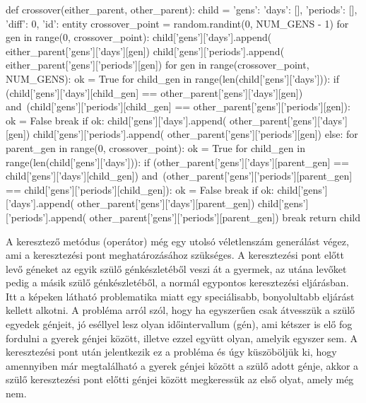 \begin{python}
def crossover(either_parent, other_parent):
    child = {'gens': {'days': [], 'periods': []},
             'diff': 0, 'id': entity}
    crossover_point = random.randint(0, NUM_GENS - 1)
    for gen in range(0, crossover_point):
        child['gens']['days'].append(
            either_parent['gens']['days'][gen])
        child['gens']['periods'].append(
            either_parent['gens']['periods'][gen])
    for gen in range(crossover_point, NUM_GENS):
        ok = True
        for child_gen in range(len(child['gens']['days'])):
            if (child['gens']['days'][child_gen] ==
               other_parent['gens']['days'][gen]) and\
               (child['gens']['periods'][child_gen] ==
               other_parent['gens']['periods'][gen]):
                ok = False
                break
        if ok:
            child['gens']['days'].append(
                other_parent['gens']['days'][gen])
            child['gens']['periods'].append(
                other_parent['gens']['periods'][gen])
        else:
            for parent_gen in range(0, crossover_point):
                ok = True
                for child_gen in range(len(child['gens']['days'])):
                    if (other_parent['gens']['days'][parent_gen] ==
                       child['gens']['days'][child_gen]) and\
                       (other_parent['gens']['periods'][parent_gen] ==
                       child['gens']['periods'][child_gen]):
                        ok = False
                        break
                if ok:
                    child['gens']['days'].append(
                        other_parent['gens']['days'][parent_gen])
                    child['gens']['periods'].append(
                        other_parent['gens']['periods'][parent_gen])
                    break
    return child
\end{python}

A keresztező metódus (operátor) még egy utolsó véletlenszám generálást végez, ami a keresztezési pont meghatározásához szükséges. A keresztezési pont előtt levő géneket az egyik szülő génkészletéből veszi át a gyermek, az utána levőket pedig a másik szülő génkészletéből, a normál egypontos keresztezési eljárásban. Itt a képeken látható problematika miatt egy speciálisabb, bonyolultabb eljárást kellett alkotni. A probléma arról szól, hogy ha egyszerűen csak átvesszük a szülő egyedek génjeit, jó eséllyel lesz olyan időintervallum (gén), ami kétszer is elő fog fordulni a gyerek génjei között, illetve ezzel együtt olyan, amelyik egyszer sem. A keresztezési pont után jelentkezik ez a probléma és úgy küszöböljük ki, hogy amennyiben már megtalálható a gyerek génjei között a szülő adott génje, akkor a szülő keresztezési pont előtti génjei között megkeressük az első olyat, amely még nem.

